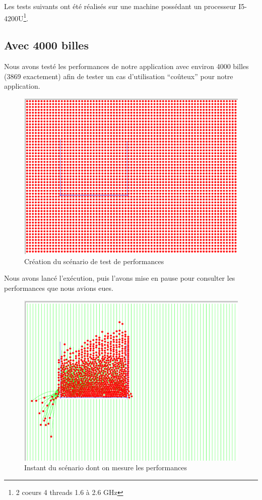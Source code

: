 \documentclass{report}
\begin{document}
Les tests suivants ont été réalisés sur une machine possédant un processeur I5-4200U\footnote{2 coeurs 4 threads 1.6 à 2.6 GHz}. 

\subsection{Avec 4000 billes}

Nous avons testé les performances de notre application avec environ 4000 billes (3869 exactement) afin de tester un cas d’utilisation “coûteux” pour notre application. 

\begin{figure}[H]
\centering
\includegraphics[scale=0.6]{cas_test.png}
\caption{Création du scénario de test de performances}
\end{figure}

Nous avons lancé l’exécution, puis l’avons mise en pause pour consulter les performances que nous avions eues.

\begin{figure}[H]
\centering
\includegraphics[scale=0.6]{one_time_tests.png}
\caption{Instant du scénario dont on mesure les performances}
\end{figure}
\end{document}
